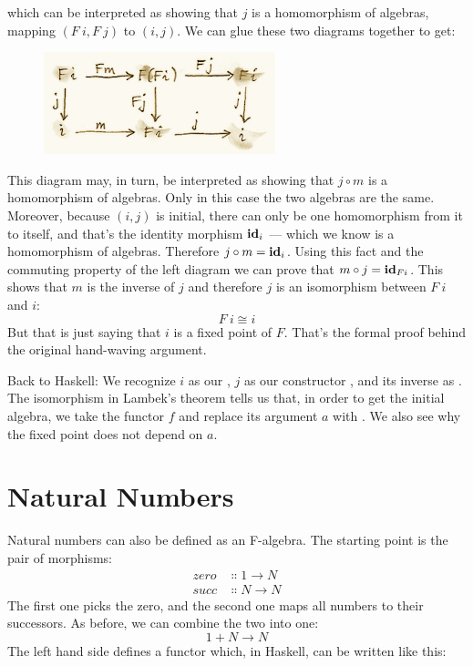 \noindent
which can be interpreted as showing that $j$ is a homomorphism of
algebras, mapping $(F\ i, F\ j)$ to $(i, j)$. We can
glue these two diagrams together to get:

\begin{figure}[H]
\centering
\includegraphics[width=0.6\textwidth]{images/alg4.png}
\end{figure}

\noindent
This diagram may, in turn, be interpreted as showing that
$j \circ m$ is a homomorphism of algebras. Only in this case the
two algebras are the same. Moreover, because $(i, j)$ is
initial, there can only be one homomorphism from it to itself, and
that's the identity morphism $\mathbf{id}_i$ --- which we know is a
homomorphism of algebras. Therefore $j \circ m = \mathbf{id}_i$. Using this
fact and the commuting property of the left diagram we can prove that
$m \circ j = \mathbf{id}_{Fi}$. This shows that $m$ is the inverse of
$j$ and therefore $j$ is an isomorphism between
$F\ i$ and $i$:
\[F\ i \cong i\]
But that is just saying that $i$ is a fixed point of $F$.
That's the formal proof behind the original hand-waving argument.

Back to Haskell: We recognize $i$ as our ,
$j$ as our constructor , and its inverse as
. The isomorphism in Lambek's theorem tells us that, in
order to get the initial algebra, we take the functor $f$ and
replace its argument $a$ with . We also see why
the fixed point does not depend on $a$.

\section{Natural Numbers}

Natural numbers can also be defined as an F-algebra. The starting point
is the pair of morphisms:
\begin{align*}
zero &\Colon 1 \to N \\
succ &\Colon N \to N
\end{align*}
The first one picks the zero, and the second one maps all numbers to
their successors. As before, we can combine the two into one:
\[1 + N \to N\]
The left hand side defines a functor which, in Haskell, can be written
like this:


